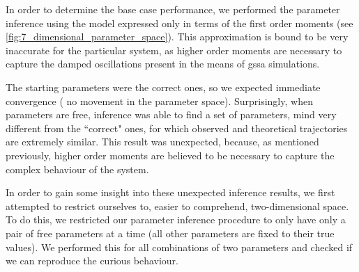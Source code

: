 In order to determine the base case performance, we performed the parameter inference using the \pft{} model expressed only in terms of the first order moments (see \autoref{fig:7_dimensional_parameter_space}).
This approximation is bound to be very inaccurate for the particular system, as higher order moments are necessary to capture the damped oscillations present in the means of \gls{gssa} simulations\cite{ale_general_2013}.




The starting parameters were the correct ones, so we expected immediate convergence (\ie{} no movement in the parameter space).
Surprisingly, when parameters are free, inference was able to find a set of parameters, mind very different from the ``correct" ones, for which observed and theoretical trajectories are extremely similar.
This result was unexpected, because, as mentioned previously, higher order moments are believed to be necessary to capture the complex behaviour of the system.



In order to gain some insight into these unexpected inference results, we first attempted to restrict ourselves to, easier to comprehend, two-dimensional space.
To do this, we restricted our parameter inference procedure to only have only a pair of free parameters at a time (all other parameters are fixed to their true values).
We performed this for all combinations of two parameters and checked if we can reproduce the curious behaviour.

